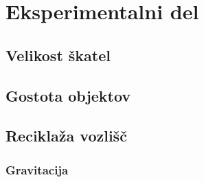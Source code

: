 \documentclass[a4paper,12pt]{article}
\begin{document}
\newpage
\section{Eksperimentalni del}

\subsection{Velikost škatel}

\subsection{Gostota objektov}

\subsection{Reciklaža vozlišč}
\subsubsection{Gravitacija}
\newpage
\lstlistoflistings{}


\end{document}
